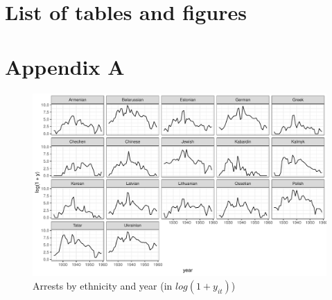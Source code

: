\newpage
\section*{List of tables and figures}



\newpage
\section*{Appendix A}



\begin{figure}[h]
\centering
\includegraphics[width=1.2\textwidth]{plots/arrests_by_ethnicity.pdf}
\caption{Arrests by ethnicity and year (in $log(1 + y_{it})$)}
\label{fig:universe}
\end{figure}
\newpage
%
